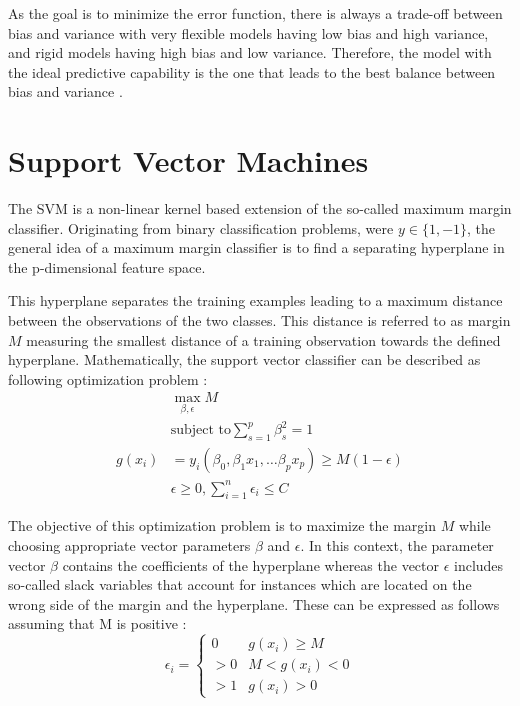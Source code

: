 As the goal is to minimize the error function, there is always a trade-off between bias and variance with very flexible models having low bias and high variance, and rigid models having high bias and low variance. Therefore, the model with the ideal predictive capability is the one that leads to the best balance between bias and variance \cite{Duda:2000:PC:954544}.

\section{Support Vector Machines}
The SVM is a non-linear kernel based extension of the so-called maximum margin classifier. Originating from binary classification problems, were $y \in \{1, -1\}$, the general idea of a maximum margin classifier is to find a separating hyperplane in the p-dimensional feature space. 

This hyperplane separates the training examples leading to a maximum distance between the observations of the two classes. This distance is referred to as margin $M$ measuring the smallest distance of a training observation towards the defined hyperplane. Mathematically, the support vector classifier can be described as following optimization problem \cite{James:2014:ISL:2517747}:
\begin{eqnarray}
  & \max_{\beta, \epsilon} M \\
  & \textrm{subject to} \sum_{s=1}^{p} \beta^2_s = 1 \\
  g(x_{i}) &= y_i(\beta_0, \beta_1 x_1, \dots \beta_p x_p) \geq M(1 - \epsilon) \\
  & \epsilon \geq 0, \sum_{i=1}^n \epsilon_i \leq C
\end{eqnarray}

The objective of this optimization problem is to maximize the margin $M$ while choosing appropriate vector parameters $\beta$ and $\epsilon$. In this context, the parameter vector $\beta$ contains the coefficients of the hyperplane whereas the vector $\epsilon$ includes so-called slack variables that account for instances which are located on the wrong side of the margin and the hyperplane. These can be expressed as follows assuming that M is positive \cite{James:2014:ISL:2517747}:
\begin{equation}
  \epsilon_i =
  \begin{cases}
    0 & g(x_i) \geq M \\
    > 0 & M < g(x_i) < 0 \\
    > 1 & g(x_i) > 0 
  \end{cases}
\end{equation}

